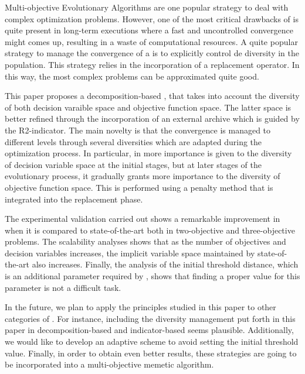 Multi-objective Evolutionary Algorithms are one popular strategy to deal with complex optimization problems.
%
However, one of the most critical drawbacks of \EAS{} is quite present in long-term executions where a fast and uncontrolled convergence might comes up, resulting in a waste of computational resources.
%
A quite popular strategy to manage the convergence of a \EA{} is to explicitly control de diversity in the population.
%
This strategy relies in the incorporation of a replacement operator.
%
In this way, the most complex problems can be approximated quite good.
%

This paper proposes a decomposition-based \MOEA{}, that takes into account the diversity of both decision varaible space and objective function space.
%
The latter space is better refined through the incorporation of an external archive which is guided by the R2-indicator.
%
The main novelty is that the convergence is managed to different levels through several diversities which are adapted during the optimization process.
%
In particular, in \AVSDMOEAD{} more importance is given to the diversity of decision variable space at the initial stages, but at later stages of the evolutionary process, it gradually grants more importance to the diversity of  objective function space.
%
This is performed using a penalty method that is integrated into the replacement phase.
%

The experimental validation carried out shows a remarkable improvement in \AVSDMOEAD{} when it is compared to state-of-the-art \MOEAS{} both in two-objective and three-objective problems.
%
The scalability analyses shows that as the number of objectives and decision variables increases, the implicit variable space maintained by state-of-the-art \MOEAS{} also increases.
%
Finally, the analysis of the initial threshold distance, which is an additional parameter required by \AVSDMOEAD{}, shows that finding a proper value for this parameter is not a difficult task.
%

In the future, we plan to apply the principles studied in this paper to other categories of \MOEAS{}.
%
For instance, including the diversity management put forth in this paper in decomposition-based and indicator-based \MOEAS{} seems plausible.
%
Additionally, we would like to develop an adaptive scheme to avoid setting the initial threshold value.
%
Finally, in order to obtain even better results, these strategies are going to be incorporated into a multi-objective memetic algorithm.
%
